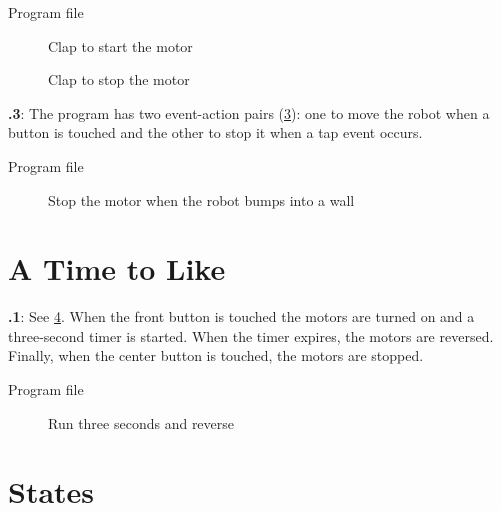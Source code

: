 \documentclass[11pt,a4paper,english]{article}
\begin{document}
{\raggedleft \hfill Program file }

\begin{figure}
\begin{center}
\caption{Clap to start the motor}\label{fig.clap-to-start}
\end{center}
\end{figure}

\begin{figure}[hbt]
\begin{center}
\caption{Clap to stop the motor}\label{fig.clap-to-stop}
\end{center}
\end{figure}

\newpage

\textbf{\thesection.3}:
The program has two event-action pairs (\cref{fig.bump}): one to
move the robot when a button is touched and the other to stop it when a
tap event occurs.

{\raggedleft \hfill Program file }

\begin{figure}[hbt]
\begin{center}
\caption{Stop the motor when the robot bumps into a wall}\label{fig.bump}
\end{center}
\end{figure}

\section{A Time to Like}

\textbf{\thesection.1}:
See \cref{fig.three}. When the front button
is touched the motors are turned on and a three-second timer is started.
When the timer expires, the motors are reversed. Finally, when the
center button is touched, the motors are stopped.

{\raggedleft \hfill Program file }


\begin{figure}[hbt]
\begin{center}
\caption{Run three seconds and reverse}\label{fig.three}
\end{center}
\end{figure}


\section{States}
\end{document}
